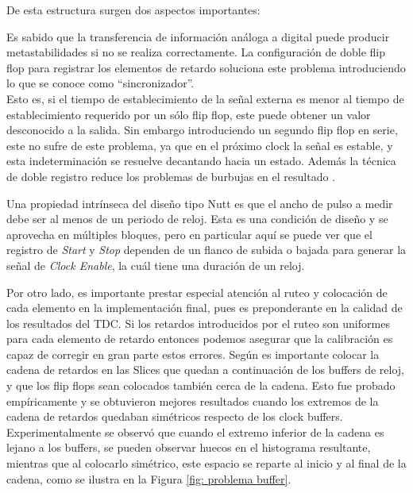 De esta estructura surgen dos aspectos importantes:
\begin{bangenumerate}
     \item Es sabido que la transferencia de información análoga a digital puede producir metastabilidades si no se 
     realiza correctamente. La configuración de doble flip flop para registrar los elementos de retardo soluciona
     este problema introduciendo lo que se conoce como ``sincronizador''. \\
     Esto es, si el tiempo de establecimiento de la señal
     externa es menor al tiempo de establecimiento requerido por un sólo flip flop, este puede obtener
     un valor desconocido a la salida. Sin embargo introduciendo un segundo flip flop en serie, este no sufre
     de este problema, ya que en el próximo clock la señal es estable, y esta indeterminación se resuelve
     decantando hacia un estado. Además la técnica de doble registro reduce los problemas de burbujas
     en el resultado \cite{machado_novel_2018}.

     \item Una propiedad intrínseca del diseño tipo Nutt es que el ancho de pulso a medir
     debe ser al menos de un periodo de reloj. Esta es una condición de diseño
     y se aprovecha en múltiples bloques, pero en particular aquí
     se puede ver que el registro de \textit{Start} y \textit{Stop} dependen de un flanco de subida o bajada para
     generar la señal de \textit{Clock Enable}, la cuál tiene una duración de un reloj.
\end{bangenumerate}

Por otro lado, es importante prestar especial atención al ruteo y colocación de cada elemento en la implementación final,
pues es preponderante en la calidad de los resultados del TDC. Si los retardos introducidos por el ruteo son 
uniformes para cada elemento de retardo entonces podemos asegurar que la calibración es capaz de corregir
en gran parte estos errores. Según \cite{machado_novel_2018} es importante colocar la cadena de retardos en las Slices
que quedan a continuación de los buffers de reloj, y que los flip flops sean colocados también cerca de la cadena. Esto
fue probado empíricamente y se obtuvieron mejores resultados cuando los extremos de la cadena de retardos quedaban simétricos
respecto de los clock buffers.\\
Experimentalmente se observó que cuando el extremo inferior de la cadena es lejano a los buffers, 
se pueden observar huecos en el histograma resultante, mientras que al colocarlo simétrico, este espacio
se reparte al inicio y al final de la cadena, como se ilustra en la Figura \ref{fig: problema buffer}.

